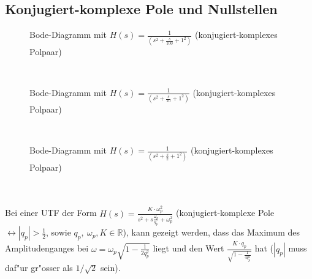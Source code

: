 {\vspace*{-7mm}\subsection{Konjugiert-komplexe Pole und Nullstellen}
\vspace*{-7mm}
\begin{figure}[!htb]%
\vspace*{-4mm}
\begin{center}
  \vspace*{-3mm}\caption{Bode-Diagramm mit $H(s)=\frac{1}{(s^2+\frac{s}{100}+1^2)}$ (konjugiert-komplexes Polpaar)}
\end{center}
\vspace*{-6mm}
\end{figure}\\

\newpage
\vspace*{-11mm}
\begin{figure}[!htb]%
\vspace*{-6mm}
\begin{center}
  \vspace*{-3mm}\caption{Bode-Diagramm mit $H(s)=\frac{1}{(s^2+\frac{s}{10}+1^2)}$ (konjugiert-komplexes Polpaar)}
\end{center}
\vspace*{-18mm}
\end{figure}\\


\begin{figure}[!htb]%
\vspace*{-6mm}
\begin{center}
  \vspace*{-3mm}\caption{Bode-Diagramm mit $H(s)=\frac{1}{(s^2+\frac{s}{2}+1^2)}$ (konjugiert-komplexes Polpaar)}
\end{center}
\vspace*{-10mm}
\end{figure}\\~\\
\nit Bei einer UTF der Form $H(s)=\frac{K\cdot\omega_p^2}{s^2+s\frac{\omega_p}{q_p}+\omega_p^2}$ (konjugiert-komplexe Pole $\leftrightarrow |q_p|>\frac{1}{2}$, sowie $q_p,~\omega_p, K\in\mathbb{R}$), kann gezeigt werden, dass das Maximum des Amplitudenganges bei $\omega=\omega_p\sqrt{1-\frac{1}{2q_p^2}}$ liegt und den Wert $\frac{K\cdot q_p}{\sqrt{1-\frac{1}{4q_p^2}}}$ hat ($|q_p|$ muss daf"ur gr"osser als $1/\sqrt{2}$ sein).


}
